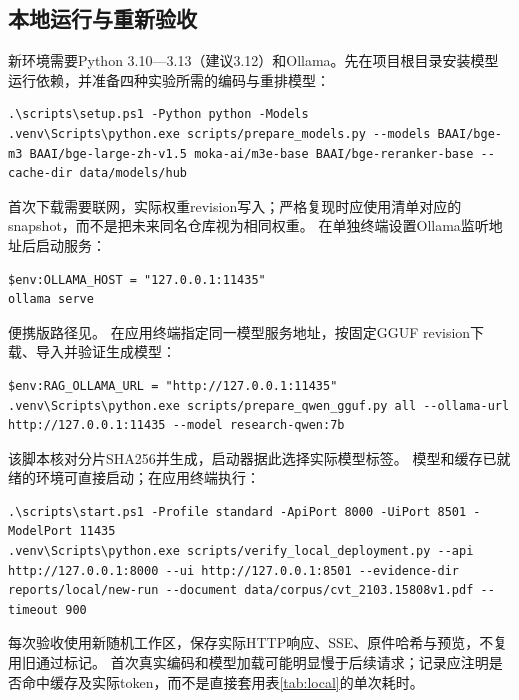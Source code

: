 \documentclass[UTF8,a4paper,zihao=-4,fontset=fandol]{ctexart}
\begin{document}
\subsection{本地运行与重新验收}
新环境需要Python 3.10—3.13（建议3.12）和Ollama。先在项目根目录安装模型运行依赖，并准备四种实验所需的编码与重排模型：
\begin{lstlisting}
.\scripts\setup.ps1 -Python python -Models
.venv\Scripts\python.exe scripts/prepare_models.py --models BAAI/bge-m3 BAAI/bge-large-zh-v1.5 moka-ai/m3e-base BAAI/bge-reranker-base --cache-dir data/models/hub
\end{lstlisting}
首次下载需要联网，实际权重revision写入；严格复现时应使用清单对应的snapshot，而不是把未来同名仓库视为相同权重。
在单独终端设置Ollama监听地址后启动服务：
\begin{lstlisting}
$env:OLLAMA_HOST = "127.0.0.1:11435"
ollama serve
\end{lstlisting}
便携版路径见。
在应用终端指定同一模型服务地址，按固定GGUF revision下载、导入并验证生成模型：
\begin{lstlisting}
$env:RAG_OLLAMA_URL = "http://127.0.0.1:11435"
.venv\Scripts\python.exe scripts/prepare_qwen_gguf.py all --ollama-url http://127.0.0.1:11435 --model research-qwen:7b
\end{lstlisting}
该脚本核对分片SHA256并生成，启动器据此选择实际模型标签。
模型和缓存已就绪的环境可直接启动；在应用终端执行：
\begin{lstlisting}
.\scripts\start.ps1 -Profile standard -ApiPort 8000 -UiPort 8501 -ModelPort 11435
.venv\Scripts\python.exe scripts/verify_local_deployment.py --api http://127.0.0.1:8000 --ui http://127.0.0.1:8501 --evidence-dir reports/local/new-run --document data/corpus/cvt_2103.15808v1.pdf --timeout 900
\end{lstlisting}
每次验收使用新随机工作区，保存实际HTTP响应、SSE、原件哈希与预览，不复用旧通过标记。
首次真实编码和模型加载可能明显慢于后续请求；记录应注明是否命中缓存及实际token，而不是直接套用表\ref{tab:local}的单次耗时。
\end{document}
